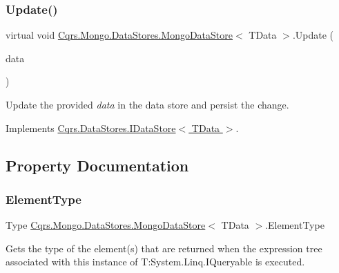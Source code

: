\subsubsection{\texorpdfstring{Update()}{Update()}}
{\footnotesize\ttfamily virtual void \hyperlink{classCqrs_1_1Mongo_1_1DataStores_1_1MongoDataStore}{Cqrs.\+Mongo.\+Data\+Stores.\+Mongo\+Data\+Store}$<$ T\+Data $>$.Update (\begin{DoxyParamCaption}\item[{T\+Data}]{data }\end{DoxyParamCaption})\hspace{0.3cm}{\ttfamily [virtual]}}



Update the provided {\itshape data}  in the data store and persist the change. 



Implements \hyperlink{interfaceCqrs_1_1DataStores_1_1IDataStore_a6d5d4dd572de8db01ff0c48d37faefa7_a6d5d4dd572de8db01ff0c48d37faefa7}{Cqrs.\+Data\+Stores.\+I\+Data\+Store$<$ T\+Data $>$}.



\subsection{Property Documentation}
\mbox{\label{classCqrs_1_1Mongo_1_1DataStores_1_1MongoDataStore_a0b55d9ca4d8ac206dd7beec30aa123df_a0b55d9ca4d8ac206dd7beec30aa123df}} 
\subsubsection{\texorpdfstring{Element\+Type}{ElementType}}
{\footnotesize\ttfamily Type \hyperlink{classCqrs_1_1Mongo_1_1DataStores_1_1MongoDataStore}{Cqrs.\+Mongo.\+Data\+Stores.\+Mongo\+Data\+Store}$<$ T\+Data $>$.Element\+Type\hspace{0.3cm}{\ttfamily [get]}}



Gets the type of the element(s) that are returned when the expression tree associated with this instance of T\+:\+System.\+Linq.\+I\+Queryable is executed. 

